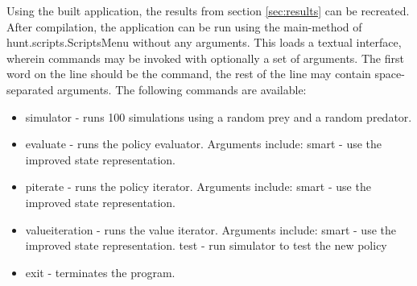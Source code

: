 Using the built application, the results from section \ref{sec:results} can be recreated. After compilation, the application can be run using the main-method of hunt.scripts.ScriptsMenu without any arguments. This loads a textual interface, wherein commands may be invoked with optionally a set of arguments. The first word on the line should be the command, the rest of the line may contain space-separated arguments. The following commands are available:

\begin{itemize}
  \item simulator - runs 100 simulations using a random prey and a random predator.
  \item evaluate - runs the policy evaluator. Arguments include:
    \subitem smart - use the improved state representation.
  \item piterate - runs the policy iterator. Arguments include:
    \subitem smart - use the improved state representation.
  \item valueiteration - runs the value iterator. Arguments include:
    \subitem smart - use the improved state representation.
     \subitem test - run simulator to test the new policy
  \item exit - terminates the program.
\end{itemize}